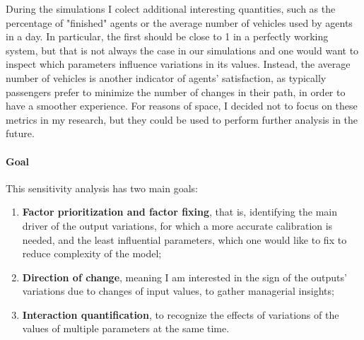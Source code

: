 During the simulations I colect additional interesting quantities, such as the percentage of "finished" agents or the average number of vehicles used by agents in a day. In particular, the first should be close to 1 in a perfectly working system, but that is not always the case in our simulations and one would want to inspect which parameters influence variations in its values. Instead, the average number of vehicles is another indicator of agents' satisfaction, as typically passengers prefer to minimize the number of changes in their path, in order to have a smoother experience. For reasons of space, I decided not to focus on these metrics in my research, but they could be used to perform further analysis in the future.


\paragraph{Goal}
This sensitivity analysis has two main goals:
\begin{enumerate}
    \item \textbf{Factor prioritization and factor fixing}, that is, identifying the main driver of the output variations, for which a more accurate calibration is needed, and the least influential parameters, which one would like to fix to reduce complexity of the model;
    \item \textbf{Direction of change}, meaning I am interested in the sign of the outputs' variations due to changes of input values, to gather managerial insights;
    \item \textbf{Interaction quantification}, to recognize the effects of variations of the values of multiple parameters at the same time. 
\end{enumerate}


